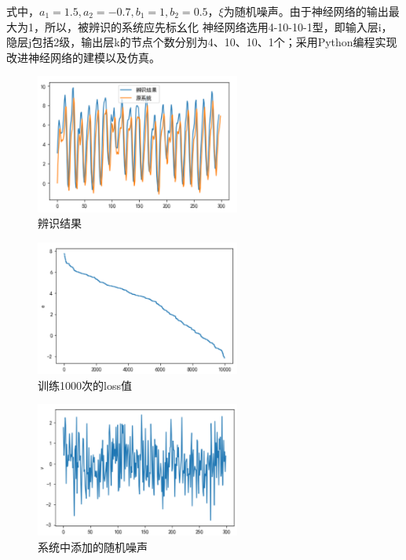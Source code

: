 \documentclass[UTF8]{ctexart}
\begin{document}
式中，$ a_1=1.5,a_2=-0.7,b_1=1,b_2=0.5 $，$\xi$为随机噪声。由于神经网络的输出最大为1，所以，被辨识的系统应先标幺化
神经网络选用4-10-10-1型，即输入层i，隐层j包括2级，输出层k的节点个数分别为4、10、10、1个；采用Python编程实现改进神经网络的建模以及仿真。


\begin{figure}[h]
	\centering
	\includegraphics [width=0.6\textwidth]{fig/png_m.png}
	\caption{辨识结果}
	\label{fig:my_png_2}
\end{figure}

\begin{figure}[h]
	\centering
	\includegraphics [width=0.6\textwidth]{fig/png_e.png}
	\caption{训练1000次的loss值}
	\label{fig:my_png_3}
\end{figure}
\begin{figure}[h]
	\centering
	\includegraphics [width=0.6\textwidth]{fig/png_v.png}
	\caption{系统中添加的随机噪声}
	\label{fig:my_png_4}
\end{figure}
\end{document}
